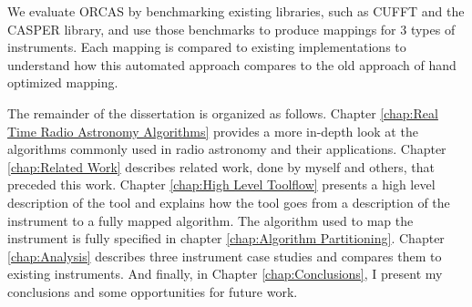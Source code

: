We evaluate ORCAS by benchmarking existing libraries, such as CUFFT and the CASPER library, and use those benchmarks to produce mappings for 3 types of instruments.
Each mapping is compared to existing implementations to understand how this automated approach compares to the old approach of hand optimized mapping.

The remainder of the dissertation is organized as follows.
Chapter \ref{chap:Real Time Radio Astronomy Algorithms} provides a more in-depth look at the algorithms commonly used in radio astronomy and their applications.
Chapter \ref{chap:Related Work} describes related work, done by myself and others, that preceded this work.
Chapter \ref{chap:High Level Toolflow} presents a high level description of the tool and explains how the tool goes from a description of the instrument to a fully mapped algorithm.
The algorithm used to map the instrument is fully specified in chapter \ref{chap:Algorithm Partitioning}.
Chapter \ref{chap:Analysis} describes three instrument case studies and compares them to existing instruments. 
And finally, in Chapter \ref{chap:Conclusions}, I present my conclusions and some opportunities for future work.






